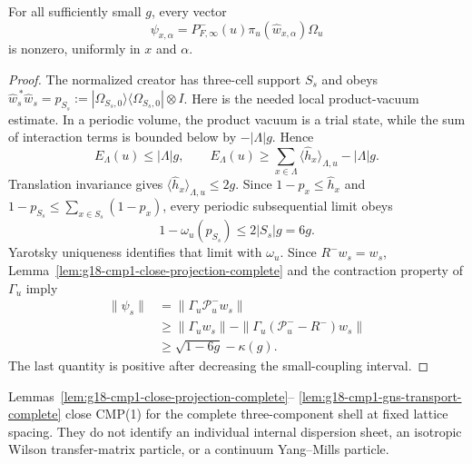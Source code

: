\begin{corollary}
\label{cor:g18-cmp1-seed-nonzero-complete}
For all sufficiently small $g$, every vector
\[
 \psi_{x,\alpha}
 =P_{F,\infty}^-(u)\pi_u(\widehat w_{x,\alpha})\Omega_u
\]
is nonzero, uniformly in $x$ and $\alpha$.
\end{corollary}

\begin{proof}
 The normalized creator has three-cell support $S_s$ and obeys
 $\widehat w_s^{\,*}\widehat w_s
 =p_{S_s}:=|\Omega_{S_s,0}\rangle\langle\Omega_{S_s,0}|\otimes I$.
 Here is the needed local product-vacuum estimate.  In a periodic volume,
 the product vacuum is a trial state, while the sum of interaction terms is
 bounded below by $-|\Lambda|g$.  Hence
 \[
  E_\Lambda(u)\le |\Lambda|g,
  \qquad
  E_\Lambda(u)\ge
  \sum_{x\in\Lambda}\langle\widehat h_x\rangle_{\Lambda,u}
       -|\Lambda|g .
 \]
 Translation invariance gives
 $\langle\widehat h_x\rangle_{\Lambda,u}\le2g$.  Since
 $1-p_x\le\widehat h_x$ and
 $1-p_{S_s}\le\sum_{x\in S_s}(1-p_x)$, every periodic subsequential limit
 obeys
 \[
  1-\omega_u(p_{S_s})\le2|S_s|g=6g.
 \]
 Yarotsky uniqueness identifies that limit with $\omega_u$.
Since $R^-w_s=w_s$, Lemma~\ref{lem:g18-cmp1-close-projection-complete} and
the contraction property of $\Gamma_u$ imply
\begin{align*}
 \|\psi_s\|
 &=\|\Gamma_u\mathcal P_u^-w_s\|\\
 &\ge \|\Gamma_uw_s\|
       -\|\Gamma_u(\mathcal P_u^--R^-)w_s\|\\
 &\ge \sqrt{1-6g}-\kappa(g).
\end{align*}
The last quantity is positive after decreasing the small-coupling interval.
\end{proof}

\begin{remark}[Scope]
\label{rem:g18-cmp1-scope-complete}
Lemmas~\ref{lem:g18-cmp1-close-projection-complete}--
\ref{lem:g18-cmp1-gns-transport-complete} close CMP(1) for the complete
three-component shell at fixed lattice spacing.  They do not identify an
individual internal dispersion sheet, an isotropic Wilson transfer-matrix
particle, or a continuum Yang--Mills particle.
\end{remark}
